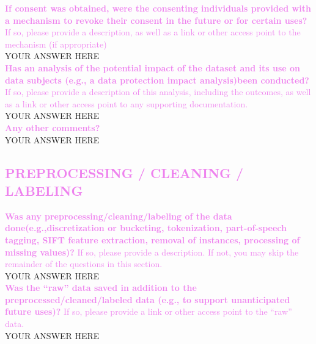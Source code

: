\documentclass[letterpaper, 10 pt, conference]{ieeeconf}  %
\newcommand{\sectioncolor}{violet}
\begin{document}
    \textcolor{\sectioncolor}{\textbf{
    If consent was obtained, were the consenting individuals provided with a
    mechanism to revoke their consent in the future or for certain uses?
    }
     If so, please provide a description, as well as a link or other access
     point to the mechanism (if appropriate)
    } \\
    YOUR ANSWER HERE \\
    
    \textcolor{\sectioncolor}{\textbf{
    Has an analysis of the potential impact of the dataset and its use on data
    subjects (e.g., a data protection impact analysis)been conducted?
    }
    If so, please provide a description of this analysis, including the
    outcomes, as well as a link or other access point to any supporting
    documentation.
    } \\
    YOUR ANSWER HERE \\
    
    \textcolor{\sectioncolor}{\textbf{
    Any other comments?
    }} \\
    YOUR ANSWER HERE \\

\begin{mdframed}[linecolor=\sectioncolor]
\section*{\textcolor{\sectioncolor}{
    PREPROCESSING / CLEANING / LABELING
}}
\end{mdframed}

    \textcolor{\sectioncolor}{\textbf{
    Was any preprocessing/cleaning/labeling of the data
    done(e.g.,discretization or bucketing, tokenization, part-of-speech
    tagging, SIFT feature extraction, removal of instances, processing of
    missing values)?
    }
    If so, please provide a description. If not, you may skip the remainder of
    the questions in this section.
    } \\
    YOUR ANSWER HERE \\

    \textcolor{\sectioncolor}{\textbf{
    Was the “raw” data saved in addition to the preprocessed/cleaned/labeled
    data (e.g., to support unanticipated future uses)?
    }
    If so, please provide a link or other access point to the “raw” data.
    } \\
    YOUR ANSWER HERE \\
\end{document}
